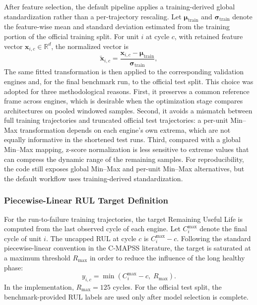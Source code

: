 After feature selection, the default pipeline applies a training-derived global standardization rather than a per-trajectory rescaling. Let $\boldsymbol{\mu}_{\mathrm{train}}$ and $\boldsymbol{\sigma}_{\mathrm{train}}$ denote the feature-wise mean and standard deviation estimated from the training portion of the official training split. For unit $i$ at cycle $c$, with retained feature vector $\mathbf{x}_{i,c}\in\mathbb{R}^{d}$, the normalized vector is
\begin{equation}
    \tilde{\mathbf{x}}_{i,c}=\frac{\mathbf{x}_{i,c}-\boldsymbol{\mu}_{\mathrm{train}}}{\boldsymbol{\sigma}_{\mathrm{train}}},
    \label{eq:normalization}
\end{equation}
The same fitted transformation is then applied to the corresponding validation engines and, for the final benchmark run, to the official test split. This choice was adopted for three methodological reasons. First, it preserves a common reference frame across engines, which is desirable when the optimization stage compares architectures on pooled windowed samples. Second, it avoids a mismatch between full training trajectories and truncated official test trajectories: a per-unit Min--Max transformation depends on each engine's own extrema, which are not equally informative in the shortened test runs. Third, compared with a global Min--Max mapping, z-score normalization is less sensitive to extreme values that can compress the dynamic range of the remaining samples. For reproducibility, the code still exposes global Min--Max and per-unit Min--Max alternatives, but the default workflow uses training-derived standardization.

\subsubsection{Piecewise-Linear RUL Target Definition}
For the run-to-failure training trajectories, the target Remaining Useful Life is computed from the last observed cycle of each engine. Let $C_i^{\max}$ denote the final cycle of unit $i$. The uncapped RUL at cycle $c$ is $C_i^{\max}-c$. Following the standard piecewise-linear convention in the C-MAPSS literature, the target is saturated at a maximum threshold $R_{\max}$ in order to reduce the influence of the long healthy phase:
\begin{equation}
    y_{i,c} = \min\left(C_i^{\max}-c,\; R_{\max}\right).
    \label{eq:rul_cap}
\end{equation}
In the implementation, $R_{\max}=125$ cycles. For the official test split, the benchmark-provided RUL labels are used only after model selection is complete.

